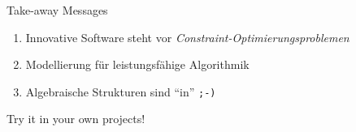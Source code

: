 \begin{frame}{Take-away Messages}
\begin{parchment}
\centering 
\begin{enumerate}
\item Innovative Software steht vor \emph{Constraint-Optimierungsproblemen}
\vspace*{1ex}
\item Modellierung für leistungsfähige Algorithmik
\vspace*{1ex}
\item Algebraische Strukturen sind ``in'' \texttt{;-)}
\end{enumerate}
\end{parchment}

\hfill Try it in your own projects!
\end{frame}